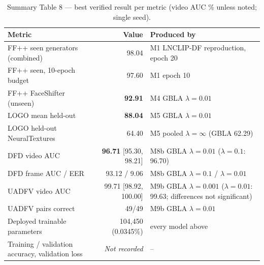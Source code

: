 \documentclass[10pt,a4paper]{article}
\begin{document}
\begin{table}[H]\centering\small
\caption{Summary Table 8 --- best verified result per metric (video AUC \% unless noted; single seed).}\label{tab:final}
\begin{tabularx}{\linewidth}{@{}YRL{5.3cm}@{}}
\toprule
Metric & Value & Produced by\\
\midrule
FF++ seen generators (combined) & 98.04 & M1 LNCLIP-DF reproduction, epoch 20\\
FF++ seen, 10-epoch budget & 97.60 & M1 epoch 10\\
FF++ FaceShifter (unseen) & \textbf{92.91} & M4 GBLA \(\lambda=0.01\)\\
LOGO mean held-out & \textbf{88.04} & M5 GBLA \(\lambda=0.01\)\\
LOGO held-out NeuralTextures & 64.40 & M5 pooled \(\lambda=\infty\) (GBLA 62.29)\\
DFD video AUC & \textbf{96.71} [95.30, 98.21] & M8b GBLA \(\lambda=0.01\) (\(\lambda=0.1\): 96.70)\\
DFD frame AUC / EER & 93.12 / 9.06 & M8b GBLA \(\lambda=0.1\) / \(\lambda=0.01\)\\
UADFV video AUC & 99.71 [98.92, 100.00] & M9b GBLA \(\lambda=0.001\) (\(\lambda=0.01\): 99.63; differences not significant)\\
UADFV pairs correct & 49/49 & M9b GBLA \(\lambda=0.01\)\\
Deployed trainable parameters & 104,450 (0.0345\%) & every model above\\
Training / validation accuracy, validation loss & \textit{Not recorded} & --\\
\bottomrule
\end{tabularx}
\end{table}

\end{document}

